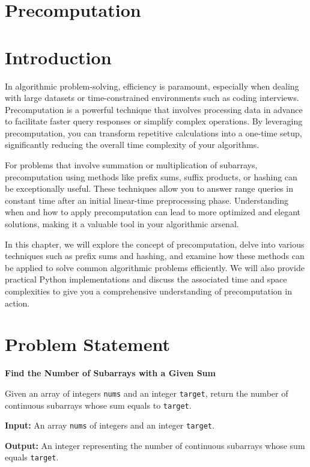 \section*{Precomputation}
\label{sec:Precomputation}

\section*{Introduction}

In algorithmic problem-solving, efficiency is paramount, especially when dealing with large datasets or time-constrained environments such as coding interviews. Precomputation is a powerful technique that involves processing data in advance to facilitate faster query responses or simplify complex operations. By leveraging precomputation, you can transform repetitive calculations into a one-time setup, significantly reducing the overall time complexity of your algorithms.

For problems that involve summation or multiplication of subarrays, precomputation using methods like prefix sums, suffix products, or hashing can be exceptionally useful. These techniques allow you to answer range queries in constant time after an initial linear-time preprocessing phase. Understanding when and how to apply precomputation can lead to more optimized and elegant solutions, making it a valuable tool in your algorithmic arsenal.

In this chapter, we will explore the concept of precomputation, delve into various techniques such as prefix sums and hashing, and examine how these methods can be applied to solve common algorithmic problems efficiently. We will also provide practical Python implementations and discuss the associated time and space complexities to give you a comprehensive understanding of precomputation in action.

\section*{Problem Statement}

\textbf{Find the Number of Subarrays with a Given Sum}

Given an array of integers \texttt{nums} and an integer \texttt{target}, return the number of continuous subarrays whose sum equals to \texttt{target}.

\textbf{Input:} An array \texttt{nums} of integers and an integer \texttt{target}.

\textbf{Output:} An integer representing the number of continuous subarrays whose sum equals \texttt{target}.

